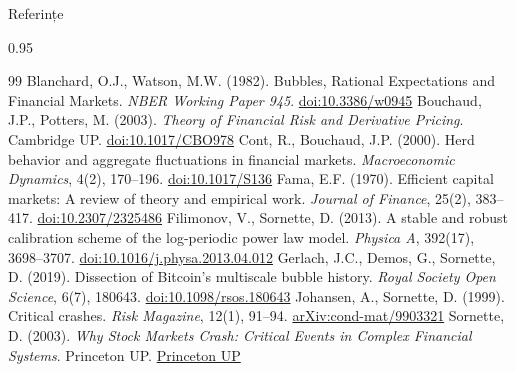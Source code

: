 \documentclass[9pt, aspectratio=169, t]{beamer}
\begin{document}
\begin{frame}{Referințe}
    \begin{cminipage}{0.95\textwidth}
    {\scriptsize
    \begin{thebibliography}{99}
         Blanchard, O.J., Watson, M.W. (1982). Bubbles, Rational Expectations and Financial Markets. \textit{NBER Working Paper 945}. \href{https://doi.org/10.3386/w0945}{\textcolor{MainBlue}{doi:10.3386/w0945}}
         Bouchaud, J.P., Potters, M. (2003). \textit{Theory of Financial Risk and Derivative Pricing}. Cambridge UP. \href{https://doi.org/10.1017/CBO9780511753893}{\textcolor{MainBlue}{doi:10.1017/CBO978}}
         Cont, R., Bouchaud, J.P. (2000). Herd behavior and aggregate fluctuations in financial markets. \textit{Macroeconomic Dynamics}, 4(2), 170--196. \href{https://doi.org/10.1017/S1365100500015029}{\textcolor{MainBlue}{doi:10.1017/S136}}
         Fama, E.F. (1970). Efficient capital markets: A review of theory and empirical work. \textit{Journal of Finance}, 25(2), 383--417. \href{https://doi.org/10.2307/2325486}{\textcolor{MainBlue}{doi:10.2307/2325486}}
         Filimonov, V., Sornette, D. (2013). A stable and robust calibration scheme of the log-periodic power law model. \textit{Physica A}, 392(17), 3698--3707. \href{https://doi.org/10.1016/j.physa.2013.04.012}{\textcolor{MainBlue}{doi:10.1016/j.physa.2013.04.012}}
         Gerlach, J.C., Demos, G., Sornette, D. (2019). Dissection of Bitcoin's multiscale bubble history. \textit{Royal Society Open Science}, 6(7), 180643. \href{https://doi.org/10.1098/rsos.180643}{\textcolor{MainBlue}{doi:10.1098/rsos.180643}}
         Johansen, A., Sornette, D. (1999). Critical crashes. \textit{Risk Magazine}, 12(1), 91--94. \href{https://doi.org/10.48550/arXiv.cond-mat/9903321}{\textcolor{MainBlue}{arXiv:cond-mat/9903321}}
         Sornette, D. (2003). \textit{Why Stock Markets Crash: Critical Events in Complex Financial Systems}. Princeton UP. \href{https://press.princeton.edu/books/paperback/9780691175959/why-stock-markets-crash}{\textcolor{MainBlue}{Princeton UP}}
    \end{thebibliography}
    }
    \end{cminipage}
\end{frame}
\end{document}
